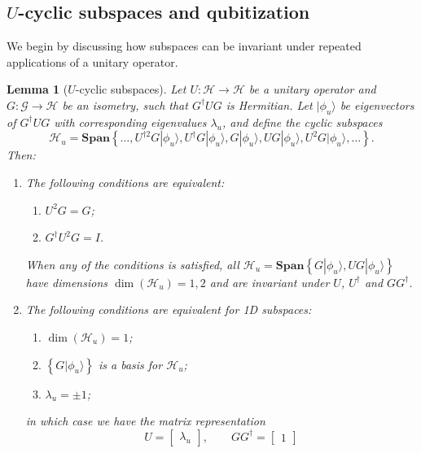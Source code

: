\documentclass[letterpaper,onecolumn,11pt,accepted=2026-02-14]{quantumarticle}
\newtheorem{lemma}{Lemma}
\theoremstyle{remark}
\theoremstyle{plain}
\newcommand{\ket}[1]{|#1\rangle}
\begin{document}
\subsection{\texorpdfstring{$U$}{U}-cyclic subspaces and qubitization}
\label{append:qubitization_subspace}
We begin by discussing how subspaces can be invariant under repeated applications of a unitary operator.
\begin{lemma}[$U$-cyclic subspaces]
\label{lem:subspace}
Let $U:\mathcal{H}\rightarrow\mathcal{H}$ be a unitary operator and $G:\mathcal{G}\rightarrow\mathcal{H}$ be an isometry, such that $G^\dagger UG$ is Hermitian. Let $\ket{\phi_u}$ be eigenvectors of $G^\dagger UG$ with corresponding eigenvalues $\lambda_u$, and define the cyclic subspaces
\begin{equation}
    \mathcal{H}_u=\mathbf{Span}\left\{\ldots,U^{\dagger2} G\ket{\phi_u},U^\dagger G\ket{\phi_u},G\ket{\phi_u},UG\ket{\phi_u},U^2G\ket{\phi_u},\ldots\right\}.
\end{equation}
Then:
\begin{enumerate}
    \item The following conditions are equivalent:
    \begin{enumerate}
        \item $U^2G=G$;
        \item $G^\dagger U^2G=I$.
    \end{enumerate}
    When any of the conditions is satisfied, all $\mathcal{H}_u=\mathbf{Span}\left\{G\ket{\phi_u},UG\ket{\phi_u}\right\}$ have dimensions $\dim(\mathcal{H}_u)=1,2$ and are invariant under $U$, $U^\dagger$ and $GG^\dagger$.
    \item The following conditions are equivalent for 1D subspaces:
    \begin{enumerate}
        \item $\dim(\mathcal{H}_u)=1$;
        \item $\left\{G\ket{\phi_u}\right\}$ is a basis for $\mathcal{H}_u$;
        \item $\lambda_u=\pm1$;
    \end{enumerate}
    in which case we have the matrix representation
    \begin{equation}
        U=\begin{bmatrix}
            \lambda_u
        \end{bmatrix},\qquad
        GG^\dagger=\begin{bmatrix}
            1

\end{bmatrix}
\end{equation}
\end{enumerate}
\end{lemma}
\end{document}
